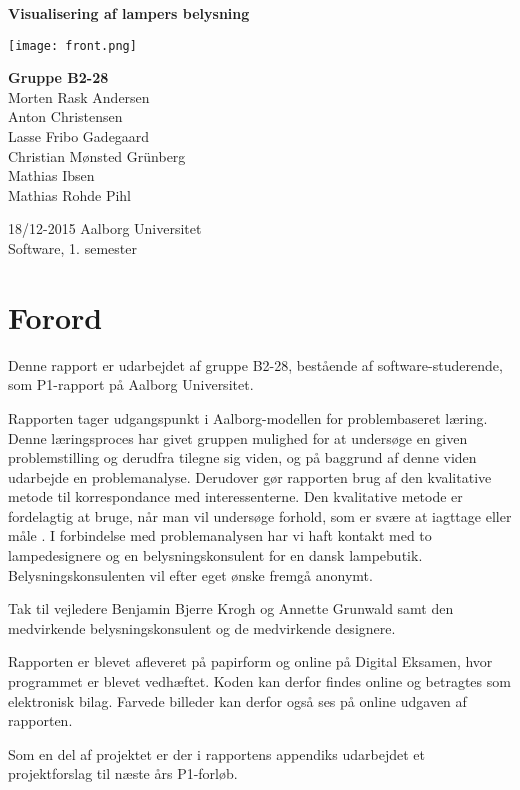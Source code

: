 \begin{titlepage}
  \vspace{0.2cm}
  \begin{center}
    \Huge{\textbf{Visualisering af lampers belysning}}
  \end{center}
  \vspace{0.2cm}
  \vfill
  \begin{center}
  \texttt{[image: front.png]}
  \end{center}
  \begin{center}
    \Large{\textbf{Gruppe B2-28}}\\
	Morten Rask Andersen\\
	Anton Christensen\\
	Lasse Fribo Gadegaard\\
	Christian Mønsted Grünberg\\
	Mathias Ibsen\\
	Mathias Rohde Pihl
  \end{center}
  \begin{center}
 	18/12-2015
    Aalborg Universitet\\
    Software, 1. semester
  \end{center}
\end{titlepage}



\addtocounter{page}{-1}
\clearpage



\clearpage


\section{Forord}
Denne rapport er udarbejdet af gruppe B2-28, bestående af software-studerende, som P1-rapport på Aalborg Universitet.

Rapporten tager udgangspunkt i Aalborg-modellen for problembaseret læring. Denne læringsproces har givet gruppen mulighed for at undersøge en given problemstilling og derudfra tilegne sig viden, og på baggrund af denne viden udarbejde en problemanalyse. Derudover gør rapporten brug af den kvalitative metode til korrespondance med interessenterne. Den kvalitative metode er fordelagtig at bruge, når man vil undersøge forhold, som er svære at iagttage eller måle \cite{kvalitativ_metode}. I forbindelse med problemanalysen har vi haft kontakt med to lampedesignere og en belysningskonsulent for en dansk lampebutik. Belysningskonsulenten vil efter eget ønske fremgå anonymt. 

Tak til vejledere Benjamin Bjerre Krogh og Annette Grunwald samt den medvirkende belysningskonsulent og de medvirkende designere.

Rapporten er blevet afleveret på papirform og online på Digital Eksamen, hvor programmet er blevet vedhæftet. Koden kan derfor findes online og betragtes som elektronisk bilag. Farvede billeder kan derfor også ses på online udgaven af rapporten. 

Som en del af projektet er der i rapportens appendiks udarbejdet et projektforslag til næste års P1-forløb.
\clearpage

\clearpage